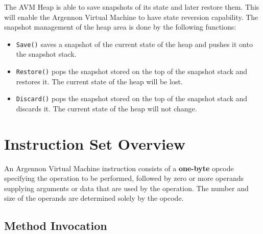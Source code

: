 
The AVM Heap is able to save snapshots of its state and later restore them. This will enable the Argennon
Virtual Machine to have state reversion capability. The snapshot management of the heap area is done by
the following functions:
\begin{itemize}
    \item \texttt{Save()} saves a snapshot of the current state of the heap and pushes it onto the
    snapshot stack.
    \item \texttt{Restore()} pops the snapshot stored on the top of the snapshot stack and restores it. The
    current state of the heap will be lost.
    \item \texttt{Discard()} pops the snapshot stored on the top of the snapshot stack and discards it. The current
    state of the heap will not change.
\end{itemize}


\section{Instruction Set Overview}\label{sec:instruction-set-overview}

An Argennon Virtual Machine instruction consists of a \textbf{one-byte} opcode specifying the operation to be
performed, followed by zero or more operands supplying arguments or data that are used by the operation.
The number and size of the operands are determined solely by the opcode.

\subsection{Method Invocation}\label{subsec:method-invocation}

